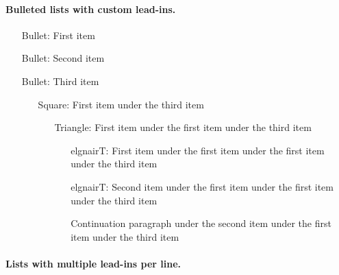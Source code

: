 \documentclass{article}
\begin{document}
\paragraph{Bulleted lists with custom lead-ins.}

\begin{itemize}
\item[Bullet:] First item

\item[Bullet:] Second item

\item[Bullet:] Third item

\begin{itemize}
\item[Square:] First item under the third item

\begin{itemize}
\item[Triangle:] First item under the first item under the third item

\begin{itemize}
\item[elgnairT:] First item under the first item under the first item under
the third item

\item[elgnairT:] Second item under the first item under the first item under
the third item

Continuation paragraph under the second item under the first item under the
third item
\end{itemize}
\end{itemize}
\end{itemize}
\end{itemize}

\paragraph{Lists with multiple lead-ins per line.}
\end{document}
